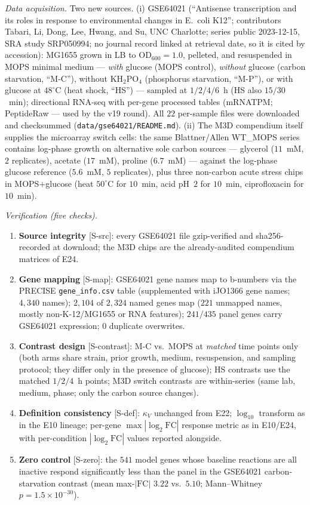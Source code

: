 \documentclass[11pt,a4paper]{article}
\theoremstyle{plain}
\theoremstyle{definition}
\theoremstyle{remark}
\begin{document}
\emph{Data acquisition.} Two new sources. (i) GSE64021 (``Antisense
transcription and its roles in response to environmental changes
in E.~coli K12''; contributors Tabari, Li, Dong, Lee, Hwang, and
Su, UNC Charlotte; series public 2023-12-15, SRA study SRP050994;
no journal record linked at retrieval date, so it is cited by
accession): MG1655 grown in LB to OD$_{600} = 1.0$, pelleted, and
resuspended in MOPS minimal medium --- \emph{with} glucose (MOPS
control), \emph{without} glucose (carbon starvation, ``M-C''),
without KH$_2$PO$_4$ (phosphorus starvation, ``M-P''), or with
glucose at $48^{\circ}$C (heat shock, ``HS'') --- sampled at
$1/2/4/6$~h (HS also $15/30$~min); directional RNA-seq with
per-gene processed tables (mRNATPM; PeptideRaw --- used by the v19
round). All $22$ per-sample files were downloaded and checksummed
(\texttt{data/gse64021/README.md}). (ii) The M3D compendium itself
supplies the microarray switch cells: the same Blattner/Allen
WT\_MOPS series contains log-phase growth on alternative sole
carbon sources --- glycerol ($11$~mM, $2$ replicates), acetate
($17$~mM), proline ($6.7$~mM) --- against the log-phase glucose
reference ($5.6$~mM, $5$ replicates), plus three non-carbon acute
stress chips in MOPS$+$glucose (heat $50^{\circ}$C for $10$~min,
acid pH~$2$ for $10$~min, ciprofloxacin for $10$~min).

\emph{Verification (five checks).}
\begin{enumerate}\itemsep0pt
\item \textbf{Source integrity} {[S-src]}: every GSE64021 file
  gzip-verified and sha256-recorded at download; the M3D chips are
  the already-audited compendium matrices of E24.
\item \textbf{Gene mapping} {[S-map]}: GSE64021 gene names map to
  b-numbers via the PRECISE \texttt{gene\_info.csv} table
  (supplemented with iJO1366 gene names; $4{,}340$ names); $2{,}104$
  of $2{,}324$ named genes map ($221$ unmapped names, mostly
  non-K-12/MG1655 or RNA features); $241/435$ panel genes carry
  GSE64021 expression; $0$ duplicate overwrites.
\item \textbf{Contrast design} {[S-contrast]}: M-C vs.\ MOPS at
  \emph{matched} time points only (both arms share strain, prior
  growth, medium, resuspension, and sampling protocol; they differ
  only in the presence of glucose); HS contrasts use the matched
  $1/2/4$~h points; M3D switch contrasts are within-series (same
  lab, medium, phase; only the carbon source changes).
\item \textbf{Definition consistency} {[S-def]}: $\kappa_V$
  unchanged from E22; $\log_{10}$ transform as in the E10 lineage;
  per-gene $\max|\log_2\mathrm{FC}|$ response metric as in E10/E24,
  with per-condition $|\log_2\mathrm{FC}|$ values reported alongside.
\item \textbf{Zero control} {[S-zero]}: the $541$ model genes whose
  baseline reactions are all inactive respond significantly less
  than the panel in the GSE64021 carbon-starvation contrast (mean
  max-$|\mathrm{FC}|$ $3.22$ vs.\ $5.10$; Mann--Whitney
  $p = 1.5 \times 10^{-30}$).
\end{enumerate}
\end{document}
